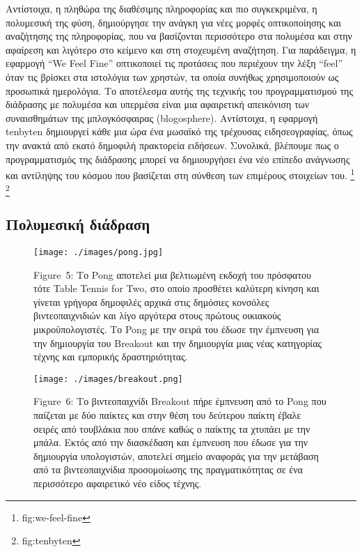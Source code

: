 \documentclass[
]{article}
\begin{document}
Αντίστοιχα, η πληθώρα της διαθέσιμης πληροφορίας και πιο συγκεκριμένα, η
πολυμεσική της φύση, δημιούργησε την ανάγκη για νέες μορφές
οπτικοποίησης και αναζήτησης της πληροφορίας, που να βασίζονται
περισσότερο στα πολυμέσα και στην αφαίρεση και λιγότερο στο κείμενο και
στη στοχευμένη αναζήτηση. Για παράδειγμα, η εφαρμογή ``We Feel Fine''
οπτικοποιεί τις προτάσεις που περιέχουν την λέξη ``feel'' όταν τις
βρίσκει στα ιστολόγια των χρηστών, τα οποία συνήθως χρησιμοποιούν ως
προσωπικά ημερολόγια. Το αποτέλεσμα αυτής της τεχνικής του
προγραμματισμού της διάδρασης με πολυμέσα και υπερμέσα είναι μια
αφαιρετική απεικόνιση των συναισθημάτων της μπλογκόσφαιρας
(blogosphere). Αντίστοιχα, η εφαρμογή tenbyten δημιουργεί κάθε μια ώρα
ένα μωσαϊκό της τρέχουσας ειδησεογραφίας, όπως την ανακτά από εκατό
δημοφιλή πρακτορεία ειδήσεων. Συνολικά, βλέπουμε πως ο προγραμματισμός
της διάδρασης μπορεί να δημιουργήσει ένα νέο επίπεδο ανάγνωσης και
αντίληψης του κόσμου που βασίζεται στη σύνθεση των επιμέρους στοιχείων
του. \footnote{fig:we-feel-fine} \footnote{fig:tenbyten}

\hypertarget{ux3c0ux3bfux3bbux3c5ux3bcux3b5ux3c3ux3b9ux3baux3ae-ux3b4ux3b9ux3acux3b4ux3c1ux3b1ux3c3ux3b7}{%
\subsection{Πολυμεσική
διάδραση}\label{ux3c0ux3bfux3bbux3c5ux3bcux3b5ux3c3ux3b9ux3baux3ae-ux3b4ux3b9ux3acux3b4ux3c1ux3b1ux3c3ux3b7}}

\leavevmode{}%
\begin{figure}
\hypertarget{fig:pong}{%
\centering
\texttt{[image: ./images/pong.jpg]}
\caption{Figure~5: Το Pong αποτελεί μια βελτιωμένη εκδοχή του πρόσφατου
τότε Table Tennis for Two, στο οποίο προσθέτει καλύτερη κίνηση και
γίνεται γρήγορα δημοφιλές αρχικά στις δημόσιες κονσόλες βιντεοπαιχνιδιών
και λίγο αργότερα στους πρώτους οικιακούς μικροϋπολογιστές. Tο Pong με
την σειρά του έδωσε την έμπνευση για την δημιουργία του Breakout και την
δημιουργία μιας νέας κατηγορίας τέχνης και εμπορικής
δραστηριότητας.}\label{fig:pong}
}
\end{figure}

\leavevmode{}%
\begin{figure}
\hypertarget{fig:breakout}{%
\centering
\texttt{[image: ./images/breakout.png]}
\caption{Figure~6: Το βιντεοπαιχνίδι Breakout πήρε έμπνευση από το Pong
που παίζεται με δύο παίκτες και στην θέση του δεύτερου παίκτη έβαλε
σειρές από τουβλάκια που σπάνε καθώς ο παίκτης τα χτυπάει με την μπάλα.
Εκτός από την διασκέδαση και έμπνευση που έδωσε για την δημιουργία
υπολογιστών, αποτελεί σημείο αναφοράς για την μετάβαση από τα
βιντεοπαιχνίδια προσομοίωσης της πραγματικότητας σε ένα περισσότερο
αφαιρετικό νέο είδος τέχνης.}\label{fig:breakout}
}
\end{figure}
\end{document}
